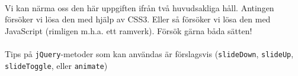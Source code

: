 \documentclass{article}
\begin{document}
      \paragraph{}
      Vi kan närma oss den här uppgiften ifrån två huvudsakliga håll. Antingen försöker vi lösa den med hjälp av CSS3. Eller så försöker vi lösa den med JavaScript (rimligen m.h.a. ett ramverk). Försök gärna båda sätten!

      \paragraph{}
      Tips på \texttt{jQuery}-metoder som kan användas är förslagsvis (\texttt{slideDown}, \texttt{slideUp}, \texttt{slideToggle}, eller \texttt{animate})

 

\end{document}
